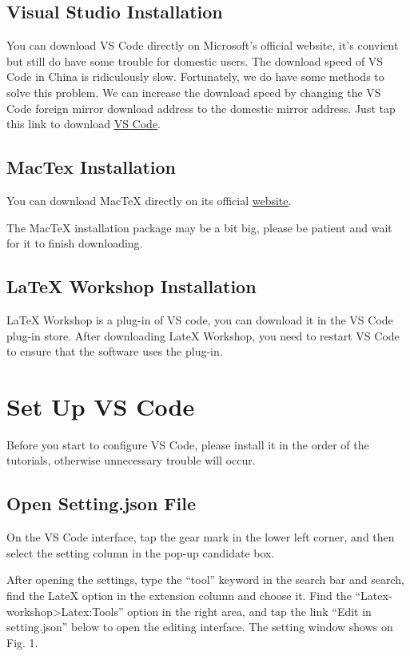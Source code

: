 \documentclass[conference]{IEEEtran}
\begin{document}
\subsection{Visual Studio Installation\cite{2019Introducing}}
You can download VS Code directly on Microsoft's official website, it's convient but still do have some trouble for domestic users.
The download speed of VS Code in China is ridiculously slow. Fortunately, we do have some methods to solve this problem.
We can increase the download speed by changing the VS Code foreign mirror download address to the domestic mirror address.
Just tap this link to download \href{https://vscode.cdn.azure.cn/stable/8490d3dde47c57ba65ec40dd192d014fd2113496/VSCode-darwin.zip}{\underline{VS Code}}.

\subsection{MacTex Installation}
You can download MacTeX directly on its official \href{http://www.tug.org/mactex/mactex-download.html}{\underline{website}}.

The MacTeX installation package may be a bit big, please be patient and wait for it to finish downloading.

\subsection{LaTeX Workshop Installation}
LaTeX Workshop is a plug-in of VS code, you can download it in the VS Code plug-in store. 
After downloading LateX Workshop, you need to restart VS Code to ensure that the software uses the plug-in.


\section{Set Up VS Code}
Before you start to configure VS Code, please install it in the order of the tutorials, otherwise unnecessary trouble will occur.

\subsection{Open Setting.json File}\label{AA}
On the VS Code interface, tap the gear mark in the lower left corner, and then select the setting column in the pop-up candidate box.

After opening the settings, type the “tool” keyword in the search bar and search, find the LateX option in the extension column and choose it. 
Find the “Latex-workshop>Latex:Tools” option in the right area, and tap the link “Edit in setting.json” below to open the editing interface. 
The setting window shows on Fig. 1.
\end{document}
